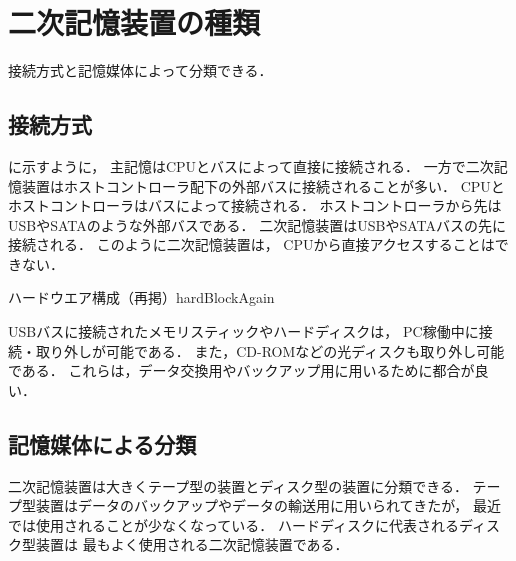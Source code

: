 \section{二次記憶装置の種類}
接続方式と記憶媒体によって分類できる．

\subsection{接続方式}
に示すように，
主記憶はCPUとバスによって直接に接続される．
一方で二次記憶装置はホストコントローラ配下の外部バスに接続されることが多い．
CPUとホストコントローラはバスによって接続される．
ホストコントローラから先はUSBやSATAのような外部バスである．
二次記憶装置はUSBやSATAバスの先に接続される．
このように二次記憶装置は，
CPUから直接アクセスすることはできない．

         {ハードウエア構成（再掲）}{hardBlockAgain}

USBバスに接続されたメモリスティックやハードディスクは，
PC稼働中に接続・取り外しが可能である．
また，CD-ROMなどの光ディスクも取り外し可能である．
これらは，データ交換用やバックアップ用に用いるために都合が良い．

\subsection{記憶媒体による分類}
二次記憶装置は大きくテープ型の装置とディスク型の装置に分類できる．
テープ型装置はデータのバックアップやデータの輸送用に用いられてきたが，
最近では使用されることが少なくなっている．
ハードディスクに代表されるディスク型装置は
最もよく使用される二次記憶装置である．

